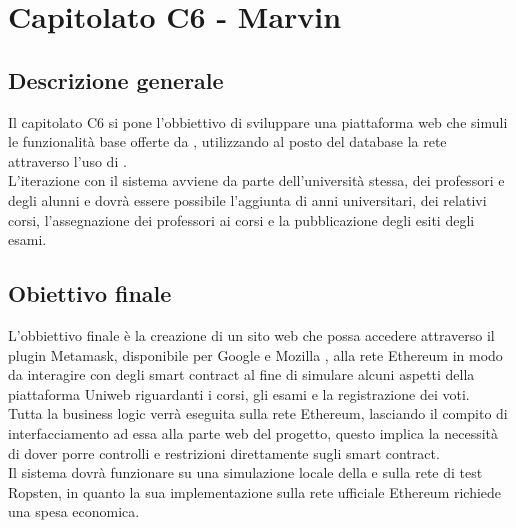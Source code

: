 \documentclass[StudioDiFattibilità.tex]{subfiles}
\begin{document}
\chapter{Capitolato C6 - Marvin}
\section{Descrizione generale}
Il capitolato C6 si pone l'obbiettivo di sviluppare una piattaforma web che simuli le funzionalità base offerte da , utilizzando al posto del database la rete  attraverso l'uso di .\\
L'iterazione con il sistema avviene da parte dell'università stessa, dei professori e degli alunni e dovrà essere possibile l'aggiunta di anni universitari, dei relativi corsi, l'assegnazione dei professori ai corsi e la pubblicazione degli esiti degli esami.
\section{Obiettivo finale}
L'obbiettivo finale è la creazione di un sito web che possa accedere attraverso il plugin Metamask, disponibile per Google  e Mozilla , alla rete Ethereum in modo da interagire con degli smart contract al fine di simulare alcuni aspetti della piattaforma Uniweb riguardanti i corsi, gli esami e la registrazione dei voti.\\
Tutta la business logic verrà eseguita sulla rete Ethereum, lasciando il compito di interfacciamento ad essa alla parte web del progetto, questo implica la necessità di dover porre controlli e restrizioni direttamente sugli smart contract.\\
Il sistema dovrà funzionare su una simulazione locale della  e sulla rete di test Ropsten, in quanto la sua implementazione sulla rete ufficiale Ethereum richiede una spesa economica.
\end{document}

